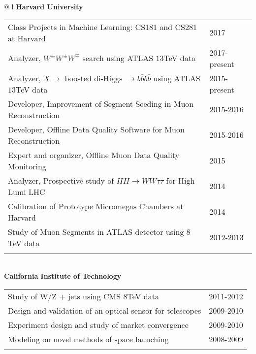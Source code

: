 \documentclass[letterpaper,11pt,oneside]{article}
\begin{document}
\begin{flushleft}
 \begin{tabular}{@{} l}
    \textbf{Harvard University} \\ 
    \begin{tabular}{@{} l l }
 Class Projects in Machine Learning: CS181 and CS281 at Harvard & 2017\\
 Analyzer, $W^{\pm} W^{\pm} W^{\mp}$ search using ATLAS $13$TeV data & 2017-present\\
 Analyzer, $X \to$ boosted  di-Higgs $\to b\bar{b}b\bar{b}$ using ATLAS $13$TeV data & 2015-present\\
 Developer, Improvement of Segment Seeding in Muon Reconstruction & 2015-2016\\
 Developer, Offline Data Quality Software for Muon Reconstruction & 2015-2016\\
 Expert and organizer,  Offline Muon Data Quality Monitoring & 2015\\
 Analyzer, Prospective study of $HH \to WW\tau\tau$ for High Lumi LHC & 2014\\
 Calibration of Prototype Micromegas Chambers at Harvard & 2014\\
 Study of Muon Segments in ATLAS detector using $8$TeV data & 2012-2013\\
    \hspace{0.8\linewidth} & \hspace{0.1\linewidth} \\
     \end{tabular}
     \\
     \textbf{California Institute of Technology} \\
     \begin{tabular}{@{} l l }
 Study of W/Z + jets using CMS $8$TeV data&2011-2012\\
 Design and validation of an optical sensor for telescopes&2009-2010\\
 Experiment design and study of market convergence &2009-2010\\
 Modeling on novel methods of space launching&2008-2009\\
    \hspace{0.8\linewidth} & \hspace{0.1\linewidth} \\
      \end{tabular}
      \end{tabular}
\end{flushleft}
\end{document}
